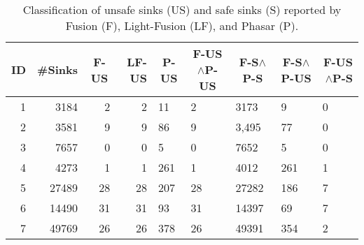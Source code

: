 \begin{table}[] \small
\caption{Classification of unsafe sinks (US) and safe sinks (S) reported by Fusion (F), Light-Fusion (LF), and Phasar (P).
}
\label{table:report}
\resizebox{\columnwidth}{!} {
\begin{tabular}{r|rrrl|llll}
\hline
ID & \multicolumn{1}{c}{\#Sinks} & \multicolumn{1}{c}{F-US} & LF-US & \multicolumn{1}{c|}{P-US} & \multicolumn{1}{c}{F-US$\wedge$P-US} & \multicolumn{1}{c}{F-S$\wedge$P-S} & \multicolumn{1}{c}{F-S$\wedge$P-US} & \multicolumn{1}{r}{F-US$\wedge$P-S} \\ \hline
1  & 3184                        & 2                        & 2     & 11                        & 2                                    & 3173                               & 9                                   & 0                                   \\
2  & 3581                        & 9                        & 9     & 86                        & 9                                    & 3,495                              & 77                                  & 0                                   \\
3  & 7657                        & 0                        & 0     & 5                         & 0                                    & 7652                               & 5                                   & 0                                   \\
4  & 4273                        & 1                        & 1     & 261                       & 1                                    & 4012                               & 261                                 & 1                                   \\
5  & 27489                       & 28                       & 28    & 207                       & 28                                   & 27282                              & 186                                 & 7                                   \\
6  & 14490                       & 31                       & 31    & 93                        & 31                                   & 14397                              & 69                                  & 7                                   \\
7  & 49769                       & 26                       & 26    & 378                       & 26                                   & 49391                              & 354                                 & 2                                   \\

\end{tabular}}
\end{table}
